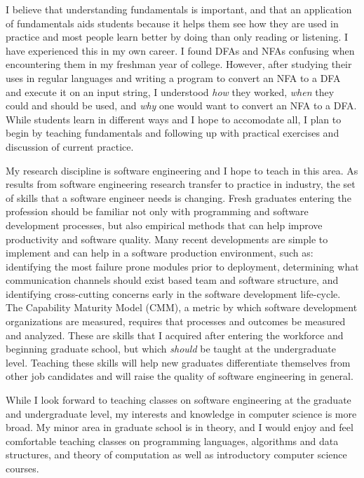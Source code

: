 \documentclass[10pt]{article}
\begin{document}
I believe that understanding fundamentals is important, and that an application
of fundamentals aids students because it helps them see how they are used in
practice and most people learn better by doing than only reading or listening.
I have experienced this in my own career.  I found DFAs and NFAs confusing when
encountering them in my freshman year of college.  However, after studying
their uses in regular languages and writing a program to convert an NFA to a DFA and execute it on
an input string, I understood \emph{how} they worked, \emph{when} they could
and should be used, and \emph{why} one would want to convert an NFA to a DFA.
While students learn in different ways and I hope to accomodate all, I plan to
begin by teaching fundamentals and following up with practical exercises and
discussion of current practice.

My research discipline is software engineering and I hope to teach in this
area.  As results from software engineering research transfer to practice in
industry, the set of skills that a software engineer needs is changing. Fresh
graduates entering the profession should be familiar not only with programming
and software development processes, but also empirical methods that can help
improve productivity and software quality.  Many recent developments are simple
to implement and can help in a software production environment, such as:
identifying the most failure prone modules prior to deployment, determining
what communication channels should exist based team and software structure, and
identifying cross-cutting concerns early in the software development
life-cycle.  The Capability Maturity Model (CMM), a metric by which
software development organizations are measured, requires that processes and
outcomes be measured and analyzed.  These are skills that I acquired after
entering the workforce and beginning graduate school, but which \emph{should}
be taught at the undergraduate level.  Teaching these skills will help new
graduates differentiate themselves from other job candidates and will raise
the quality of software engineering in general.

While I look forward to teaching classes on software engineering at the
graduate and undergraduate level, my interests and knowledge in computer
science is more broad.  My minor area in graduate school is in theory, and I
would enjoy and feel comfortable teaching classes on programming languages,
algorithms and data structures, and theory of computation as well as
introductory computer science courses.
\end{document}
